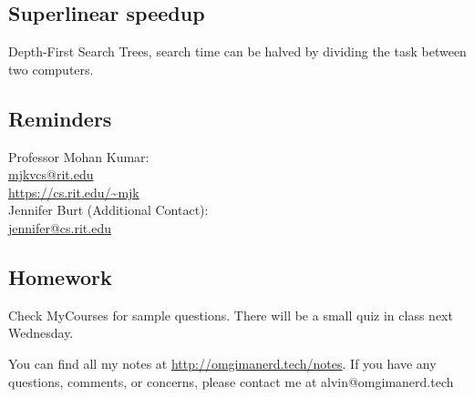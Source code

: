\documentclass{math}
\begin{document}
\subsection*{Superlinear speedup}
Depth-First Search Trees, search time can be halved by dividing the task
between two computers.

\subsection*{Reminders}
Professor Mohan Kumar: \\
\url{mjkvcs@rit.edu} \\
\url{https://cs.rit.edu/~mjk} \\

\noindent Jennifer Burt (Additional Contact): \\
\url{jennifer@cs.rit.edu}

\subsection*{Homework}
Check MyCourses for sample questions. There will be a small quiz in class
next Wednesday.

\begin{center}
  You can find all my notes at \url{http://omgimanerd.tech/notes}. If you have
  any questions, comments, or concerns, please contact me at
  alvin@omgimanerd.tech
\end{center}
\end{document}
